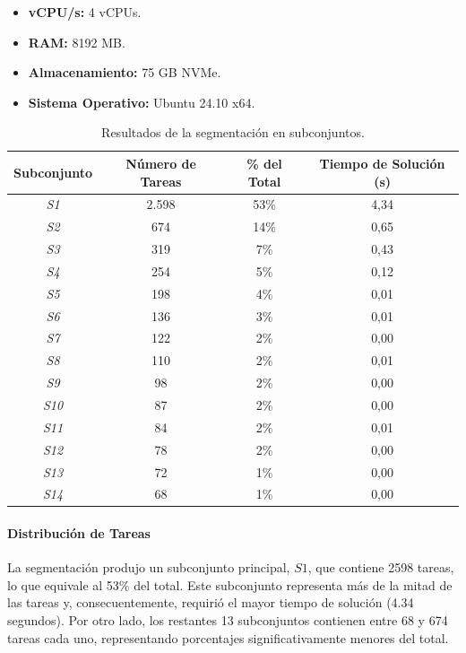 \documentclass{article}
\begin{document}
\begin{itemize}
    \item \textbf{vCPU/s:} 4 vCPUs.
    \item \textbf{RAM:} 8192 MB.
    \item \textbf{Almacenamiento:} 75 GB NVMe.
    \item \textbf{Sistema Operativo:} Ubuntu 24.10 x64.
\end{itemize}

\begin{table}[H]
    \centering
    \begin{tabular}{cccc}
        \toprule
        \textbf{Subconjunto} & \textbf{Número de Tareas} & \textbf{\% del Total} & \textbf{Tiempo de Solución (s)} \\
        \midrule
        \textit{S1} & 2.598 & 53\% & 4,34 \\
        \textit{S2} & 674 & 14\% & 0,65 \\
        \textit{S3} & 319 & 7\% & 0,43 \\
        \textit{S4} & 254 & 5\% & 0,12 \\
        \textit{S5} & 198 & 4\% & 0,01 \\
        \textit{S6} & 136 & 3\% & 0,01 \\
        \textit{S7} & 122 & 2\% & 0,00 \\
        \textit{S8} & 110 & 2\% & 0,01 \\
        \textit{S9} & 98 & 2\% & 0,00 \\
        \textit{S10} & 87 & 2\% & 0,00 \\
        \textit{S11} & 84 & 2\% & 0,01 \\
        \textit{S12} & 78 & 2\% & 0,00 \\
        \textit{S13} & 72 & 1\% & 0,00 \\
        \textit{S14} & 68 & 1\% & 0,00 \\
        \bottomrule
    \end{tabular}
    \caption{Resultados de la segmentación en subconjuntos.}
    \label{tab:subsets_results}
\end{table}


\paragraph{Distribución de Tareas}  
La segmentación produjo un subconjunto principal, \( S1 \), que contiene 2598 tareas, lo que equivale al 53\% del total. Este subconjunto representa más de la mitad de las tareas y, consecuentemente, requirió el mayor tiempo de solución (4.34 segundos). Por otro lado, los restantes 13 subconjuntos contienen entre 68 y 674 tareas cada uno, representando porcentajes significativamente menores del total.  
\end{document}
